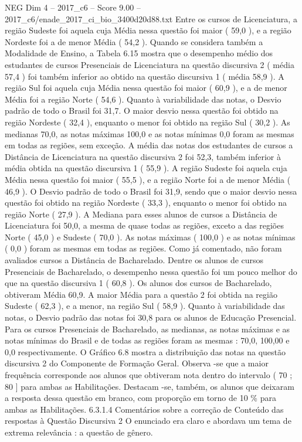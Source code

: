 \begin{textsample}{NEG Dim 4 – 2017\_c6 – Score 9.00 – 2017\_c6/enade\_2017\_ci\_bio\_3400d20d88.txt}
Entre os cursos de Licenciatura, a região Sudeste foi aquela cuja Média nessa questão foi maior ( 59,0 ), e a região Nordeste foi a de menor Média ( 54,2 ).
Quando se considera também a Modalidade de Ensino, a Tabela 6.15 mostra que o desempenho médio dos estudantes de cursos Presenciais de Licenciatura na questão discursiva 2 ( média 57,4 ) foi também inferior ao obtido na questão discursiva 1 ( média 58,9 ).
A região Sul foi aquela cuja Média nessa questão foi maior ( 60,9 ), e a de menor Média foi a região Norte ( 54,6 ).
Quanto à variabilidade das notas, o Desvio padrão de todo o Brasil foi 31,7.
O maior desvio nessa questão foi obtido na região Nordeste ( 32,4 ), enquanto o menor foi obtido na região Sul ( 30,2 ).
As medianas 70,0, as notas máximas 100,0 e as notas mínimas 0,0 foram as mesmas em todas as regiões, sem exceção.
A média das notas dos estudantes de cursos a Distância de Licenciatura na questão discursiva 2 foi 52,3, também inferior à média obtida na questão discursiva 1 ( 55,9 ).
A região Sudeste foi aquela cuja Média nessa questão foi maior ( 55,5 ), e a região Norte foi a de menor Média ( 46,9 ).
O Desvio padrão de todo o Brasil foi 31,9, sendo que o maior desvio nessa questão foi obtido na região Nordeste ( 33,3 ), enquanto o menor foi obtido na região Norte ( 27,9 ).
A Mediana para esses alunos de cursos a Distância de Licenciatura foi 50,0, a mesma de quase todas as regiões, exceto a das regiões Norte ( 45,0 ) e Sudeste ( 70,0 ).
As notas máximas ( 100,0 ) e as notas mínimas ( 0,0 ) foram as mesmas em todas as regiões.
Como já comentado, não foram avaliados cursos a Distância de Bacharelado.
Dentre os alunos de cursos Presenciais de Bacharelado, o desempenho nessa questão foi um pouco melhor do que na questão discursiva 1 ( 60,8 ).
Os alunos dos cursos de Bacharelado, obtiveram Média 60,9.
A maior Média para a questão 2 foi obtida na região Sudeste ( 62,3 ), e a menor, na região Sul ( 58,9 ).
Quanto à variabilidade das notas, o Desvio padrão das notas foi 30,8 para os alunos de Educação Presencial.
Para os cursos Presenciais de Bacharelado, as medianas, as notas máximas e as notas mínimas do Brasil e de todas as regiões foram as mesmas : 70,0, 100,00 e 0,0 respectivamente.
O Gráfico 6.8 mostra a distribuição das notas na questão discursiva 2 do Componente de Formação Geral.
Observa -se que a maior frequência corresponde aos alunos que obtiveram nota dentro do intervalo ( 70 ; 80 ] para ambas as Habilitações.
Destacam -se, também, os alunos que deixaram a resposta dessa questão em branco, com proporção em torno de 10 \% para ambas as Habilitações. 6.3.1.4 Comentários sobre a correção de Conteúdo das respostas à Questão Discursiva 2 O enunciado era claro e abordava um tema de extrema relevância : a questão de gênero.

\end{textsample}
